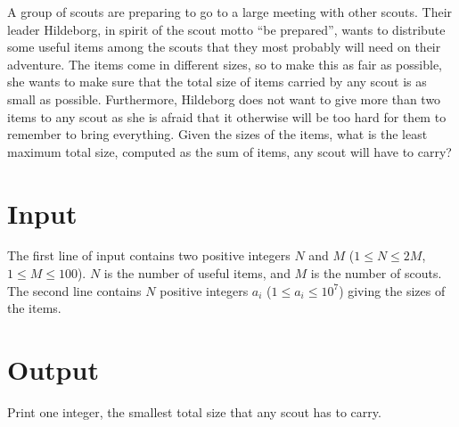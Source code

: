 %

A group of scouts are preparing to go to a large meeting with other scouts. Their leader Hildeborg, in spirit of the scout motto ``be prepared'', wants to distribute some useful items among the scouts that they most probably will need on their adventure. The items come in different sizes, so to make this as fair as possible, she wants to make sure that the total size of items carried by any scout is as small as possible. Furthermore, Hildeborg does not want to give more than two items to any scout as she is afraid that it otherwise will be too hard for them to remember to bring everything. Given the sizes of the items, what is the least maximum total size, computed as the sum of items, any scout will have to carry?

\section*{Input}
The first line of input contains two positive integers $N$ and $M$ ($1 \leq N \leq 2M$, $1 \leq M \leq 100$). 
$N$ is the number of useful items, and $M$ is the number of scouts. 
The second line contains $N$ positive integers $a_i$ ($1 \leq a_i\leq 10^7$) giving the sizes of the items. 

\section*{Output}
Print one integer, the smallest total size that any scout has to carry.

